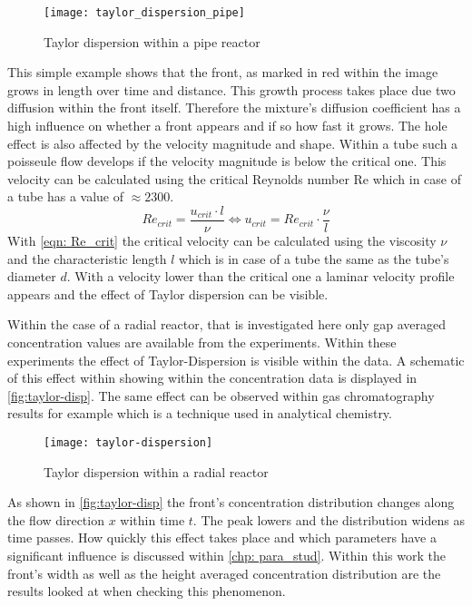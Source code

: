 \documentclass[../thesis.tex]{subfiles}
\begin{document}
\begin{figure}[htbp]
	\centering
	\texttt{[image: taylor\_dispersion\_pipe]}
	\caption{Taylor dispersion within a pipe reactor}
	\label{fig: taylor_disp_pipe}
\end{figure}
This simple example shows that the front, as marked in red within the image grows in length over time and distance. This growth process takes place due two diffusion within the front itself. Therefore the mixture's diffusion coefficient has a high influence on whether a front appears and if so how fast it grows. The hole effect is also affected by the velocity magnitude and shape. Within a tube such a poisseule flow develops if the velocity magnitude is below the critical one. This velocity can be calculated using the critical Reynolds number Re which in case of a tube has a value of $\approx 2300$. 
\begin{equation}
	\label{eqn: Re_crit}
	Re_{crit} = \dfrac{u_{crit} \cdot l}{\nu} \Leftrightarrow u_{crit} = Re_{crit} \cdot \dfrac{\nu}{l}
\end{equation}
With \autoref{eqn: Re_crit} the critical velocity can be calculated using the viscosity $\nu$ and the characteristic length $l$ which is in case of a tube the same as the tube's diameter $d$. With a velocity lower than the critical one a laminar velocity profile appears and the effect of Taylor dispersion can be visible.

Within the case of a radial reactor, that is investigated here only gap averaged concentration values are available from the experiments. Within these experiments the effect of Taylor-Dispersion is visible within the data. A schematic \cite{levenspiel1998chemical} of this effect within showing within the concentration data is displayed in \autoref{fig:taylor-disp}. The same effect can be observed within gas chromatography results for example which is a technique used in analytical chemistry.
\begin{figure}[htbp]
	\centering
	\texttt{[image: taylor-dispersion]}
	\caption{Taylor dispersion within a radial reactor}
	\label{fig:taylor-disp}
\end{figure}

As shown in \autoref{fig:taylor-disp} the front's concentration distribution changes along the flow direction $x$ within time $t$. The peak lowers and the distribution widens as time passes. How quickly this effect takes place and which parameters have a significant influence is discussed within \autoref{chp: para_stud}. Within this work the front's width as well as the height averaged concentration distribution are the results looked at when checking this phenomenon.
\end{document}

